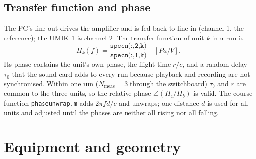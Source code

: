 \documentclass[a4paper,10pt]{article}
\newcommand{\file}[1]{\nolinkurl{#1}}
\begin{document}
\subsection{Transfer function and phase}
The PC's line-out drives the amplifier and is fed back to line-in (channel 1, the reference);
the UMIK-1 is channel 2. The transfer function of unit $k$ in a run is
\begin{equation}
H_k(f) = \frac{\texttt{specn(:,2,k)}}{\texttt{specn(:,1,k)}} \quad [\si{Pa/V}].
\end{equation}
Its phase contains the unit's own phase, the flight time $r/c$, and a random delay
$\tau_0$ that the sound card adds to every run because playback and recording are not
synchronised. Within one run ($N_\mathrm{meas}=3$ through the switchboard) $\tau_0$ and $r$ are
common to the three units, so the relative phase $\angle(H_a/H_b)$ is valid. The course function
\file{phaseunwrap.m} adds $2\pi f d/c$ and unwraps; one distance $d$ is used for all units and
adjusted until the phases are neither all rising nor all falling.

\section{Equipment and geometry}
\begin{center}
\end{center}
\end{document}
